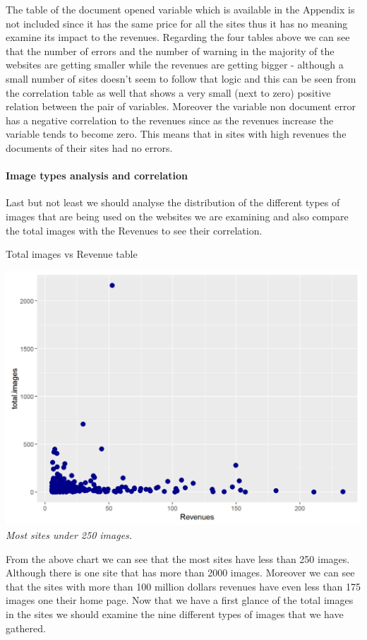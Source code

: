 \documentclass{article}
\begin{document}
The table of the document opened variable which is available in the Appendix is not included since it has the same price for all the sites thus it has no meaning examine its impact to the revenues. Regarding the four tables above we can see that the number of errors and the number of warning in the majority of the websites are getting smaller while the revenues are getting bigger - although a small number of sites doesn't seem to follow that logic and this can be seen from the correlation table as well that shows a very small (next to zero) positive relation between the pair of variables. Moreover the variable non document error has a negative correlation to the revenues since as the revenues increase the variable tends to become zero. This means that in sites with high revenues the documents of their sites had no errors.
\paragraph{Image types analysis and correlation}
Last but not least we should analyse the distribution of the different types of images that are being used on the websites we are examining and also compare the total images with the Revenues to see their correlation.
\begin{table}[H]
\centering
\caption{Total images vs Revenue table}
\begin{center}
\includegraphics[scale=0.5]{../R/photos/53_timg_rev.png}    \\
\textit{Most sites under 250 images.}
\end{center}
\end{table}
From the above chart we can see that the most sites have less than 250 images. Although there is one site that has more than 2000 images. Moreover we can see that the sites with more than 100 million dollars revenues have even less than 175 images one their home page. Now that we have a first glance of the total images in the sites we should examine the nine different types of images that we have gathered.
\end{document}
